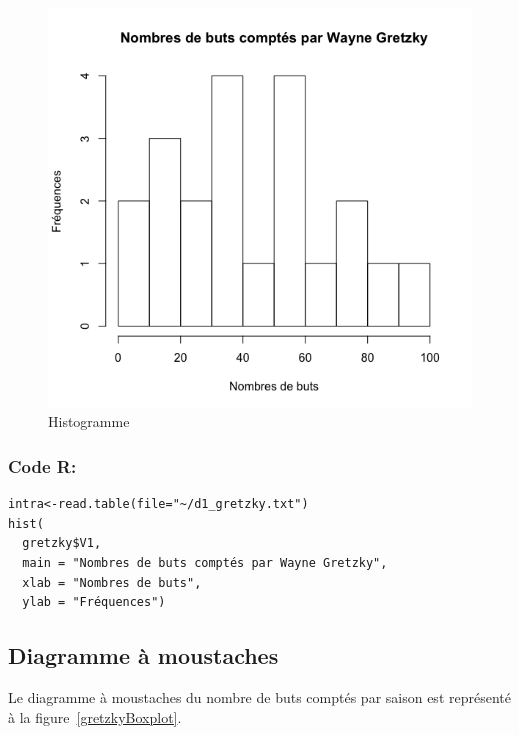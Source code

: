 \documentclass[10pt,twocolumn]{article}
\begin{document}
\begin{figure}[htbp]
	\caption{Histogramme}
	\label{gretzkyHist}
	\centering
	\includegraphics[width=\linewidth]{d1_gretzkyHist}
\end{figure}

\subsubsection*{Code R:}
\begin{verbatim}
intra<-read.table(file="~/d1_gretzky.txt")
hist(
  gretzky$V1,
  main = "Nombres de buts comptés par Wayne Gretzky",
  xlab = "Nombres de buts",
  ylab = "Fréquences")
\end{verbatim}


\subsection{Diagramme à moustaches}
Le diagramme à moustaches du nombre de buts comptés par saison est représenté à la figure~\ref{gretzkyBoxplot}.
\end{document}
